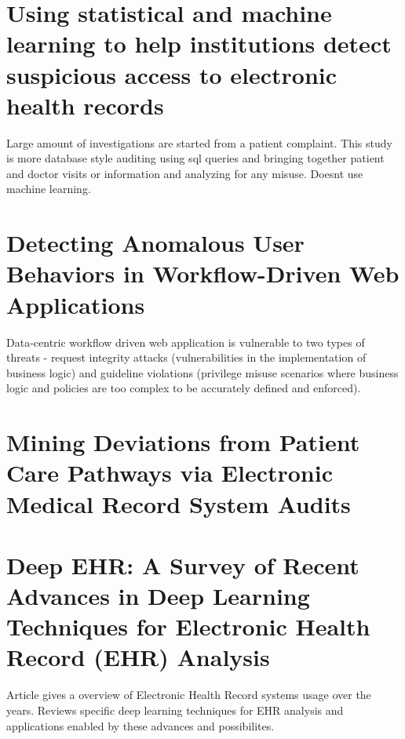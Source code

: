 \documentclass[12pt]{article}
\begin{document}
\section{Using statistical and machine learning to help institutions detect suspicious access to electronic health records}
Large amount of investigations are started from a patient complaint.  \cite{Fabbri:2011:EA:2047485.2047486} 
This study is more database style auditing using sql queries and bringing together patient and doctor visits or information and analyzing for any misuse. Doesnt use machine learning. 

\section{Detecting Anomalous User Behaviors in Workflow-Driven Web Applications}
Data-centric workflow driven web application is vulnerable to two types of threats - request integrity attacks (vulnerabilities in the implementation of business logic) and guideline violations (privilege misuse scenarios where business logic and policies are too complex to be accurately defined and enforced). \cite{6424834}

\section{Mining Deviations from Patient Care Pathways via Electronic Medical Record System Audits}
\cite{Zhang:2013:MDP:2555810.2544102}

\section{Deep EHR: A Survey of Recent Advances in Deep Learning Techniques for Electronic Health Record (EHR) Analysis}
Article gives a overview of Electronic Health Record systems usage over the years. Reviews specific deep learning techniques for EHR analysis and applications enabled by these advances and possibilites. 
\cite{8086133}

\footnotesize

\end{document}
